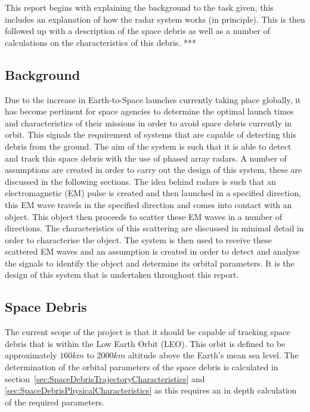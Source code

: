 \documentclass[11pt]{witseiepaper}
\begin{document}
\begin{bibunit}[witseie]
This report begins with explaining the background to the task given, this includes an explanation of how the radar system works (in principle). This is then followed up with a description of the space debris as well as a number of calculations on the characteristics of this debris. ***





\subsection{Background} \label{sec:Background}
Due to the increase in Earth-to-Space launches currently taking place globally, it has become pertinent for space agencies to determine the optimal launch times and characteristics of their missions in order to avoid space debris currently in orbit. This signals the requirement of systems that are capable of detecting this debris from the ground.
The aim of the system is such that it is able to detect and track this space debris with the use of phased array radars.
A number of assumptions are created in order to carry out the design of this system, these are discussed in the following sections.
The idea behind radars is such that an electromagnetic (EM) pulse is created and then launched in a specified direction, this EM wave travels in the specified direction and comes into contact with an object. This object then proceeds to scatter these EM waves in a number of directions. The characteristics of this scattering are discussed in minimal detail in order to characterise the object. 
The system is then used to receive these scattered EM waves and an assumption is created in order to detect and analyse the signals to identify the object and determine its orbital parameters.
It is the design of this system that is undertaken throughout this report. 

\subsection{Space Debris} \label{sec:SpaceDebris}
The current scope of the project is that it should be capable of tracking space debris that is within the Low Earth Orbit (LEO). This orbit is defined to be approximately $160 km$ to $2000 km$ altitude above the Earth's mean sea level. 
The determination of the orbital parameters of the space debris is calculated in section~\ref{sec:SpaceDebrisTrajectoryCharacteristics} and \ref{sec:SpaceDebrisPhysicalCharacteristics} as this requires an in depth calculation of the required parameters.


\end{bibunit}
\end{document}
